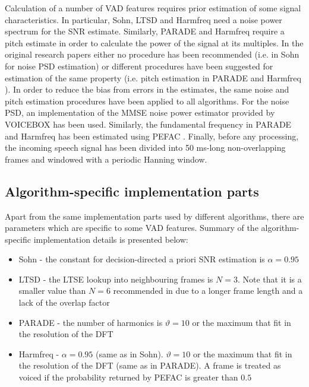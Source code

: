 Calculation of a number of VAD features requires prior estimation of some signal characteristics. In particular, Sohn, LTSD and Harmfreq need a noise power spectrum for the SNR estimate. Similarly, PARADE and Harmfreq require a pitch estimate in order to calculate the power of the signal at its multiples. In the original research papers either no procedure has been recommended (i.e. in Sohn \cite{Sohn} for noise PSD estimation) or different procedures have been suggested for estimation of the same property (i.e. pitch estimation in PARADE \cite{PARADE} and Harmfreq \cite{Tan}). In order to reduce the bias from errors in the estimates, the same noise and pitch estimation procedures have been applied to all algorithms. For the noise PSD, an implementation of the MMSE noise power estimator \cite{MMSEnoise} provided by VOICEBOX \cite{VOICEBOX} has been used. Similarly, the fundamental frequency in PARADE and Harmfreq has been estimated using PEFAC \cite{PEFAC}. Finally, before any processing, the incoming speech signal has been divided into 50 ms-long non-overlapping frames and windowed with a periodic Hanning window.

\subsection{Algorithm-specific implementation parts}

Apart from the same implementation parts used by different algorithms, there are parameters which are specific to some VAD features. Summary of the algorithm-specific implementation details is presented below:

\begin{itemize}
\item Sohn - the constant for decision-directed a priori SNR estimation is $\alpha = 0.95$
\item LTSD - the LTSE lookup into neighbouring frames is $N = 3$. Note that it is a smaller value than $N=6$ recommended in \cite{LTSD} due to a longer frame length and a lack of the overlap factor
\item PARADE - the number of harmonics is $\vartheta = 10$ or the maximum that fit in the resolution of the DFT
\item Harmfreq - $\alpha = 0.95$ (same as in Sohn). $\vartheta = 10$ or the maximum that fit in the resolution of the DFT (same as in PARADE). A frame is treated as voiced if the probability returned by PEFAC is greater than $0.5$
\end{itemize}

